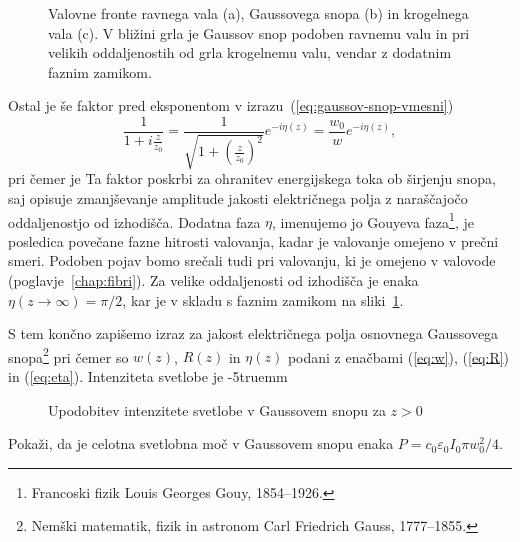 \begin{figure}[h]
\centering
\def\svgwidth{80truemm} 

\caption{Valovne fronte ravnega vala (a), Gaussovega snopa (b) in
krogelnega vala (c). V bližini grla je Gaussov snop podoben ravnemu valu in 
pri velikih oddaljenostih od grla krogelnemu valu, vendar z dodatnim faznim zamikom.}
\label{fig:ravni-Gaussov-krogelni-val}
\end{figure}

Ostal je  še faktor pred eksponentom v izrazu~(\ref{eq:gaussov-snop-vmesni})
\begin{equation}
\frac{1}{1+i\frac{z}{z_{0}}}=\frac{1}{\sqrt{1+(\frac{z}{z_0})^{2}}}e^{-i\eta(z)}=\frac{w_{0}}{w}e^{-i\eta(z)},
\end{equation}
 pri čemer je
Ta faktor poskrbi za ohranitev energijskega toka ob širjenju snopa, saj opisuje zmanjševanje amplitude
jakosti električnega polja z naraščajočo oddaljenostjo od izhodišča.  
Dodatna faza $\eta$, imenujemo jo Gouyeva 
faza\footnote{Francoski fizik Louis Georges Gouy, 1854--1926.},
je posledica povečane fazne hitrosti valovanja, 
kadar je valovanje omejeno v prečni smeri. Podoben pojav bomo srečali tudi pri valovanju, ki je 
omejeno v valovode (poglavje~\ref{chap:fibri}). Za velike oddaljenosti od izhodišča je enaka $\eta (z\to\infty) = \pi/2$,
kar je v skladu s faznim zamikom na sliki~\ref{fig:ravni-Gaussov-krogelni-val}.

S tem končno zapišemo izraz za jakost električnega polja osnovnega Gaussovega 
snopa\footnote{Nemški matematik, fizik in astronom Carl Friedrich Gauss, 1777--1855.}
pri čemer so $w(z)$, $R(z)$ in $\eta(z)$ podani z enačbami (\ref{eq:w}), (\ref{eq:R}) in (\ref{eq:eta}).
Intenziteta svetlobe je 
\vglue-5truemm
\begin{figure}[h]
\centering
\def\svgwidth{100truemm} 

\caption{Upodobitev intenzitete svetlobe v Gaussovem snopu za $z>0$ }
\label{fig:Gauss_3D}
\end{figure}

\begin{definition}
\label{naloga-širina-snopa}
Pokaži, da je celotna svetlobna moč v Gaussovem snopu 
enaka 
$P = c_0 \varepsilon_0 I_0 \pi w_0^2/4$.
\end{definition}

